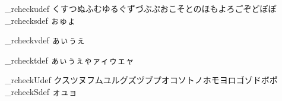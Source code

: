 \def\brl@mecab_rcheck_UU#1{%
  \ifcsname brl@mecab_rcheckV@\string#1\endcsname%
    \expandafter\aftergroup\brl@tmpfirst%
    \aftergroup\brl@mecab_rcheck@c%
    \aftergroup\brl@mecab_rcheck@U%
    \aftergroup#1%
    \let\brl@tmp\empty%
  \else%
    \aftergroup\brl@text_cmd_ambb%
    \expandafter\aftergroup\brl@tmpfirst%
    \aftergroup\brl@mecab_rcheck@U%
    \aftergroup\brl@text_cmd_ambe%
    \brl@mecab@doubtfultrue%
    \def\brl@tmp{#1}%
  \fi%
  \let\brl@mecab@prevchar\empty%
  \expandafter\brl@mecab_rcheck_\brl@tmp%
}




\def\brl@mecab_rcheckudef#1{%
  \def\brl@tmp{#1}%
  \ifx\brl@tmp\brl@@end%
  \else%
    \@namedef{brl@mecab_rcheck@#1}{\brl@mecab_rcheck_u#1}%
    \expandafter\brl@mecab_rcheckudef%
  \fi%
}
\def\brl@mecab_rchecksdef#1{%
  \def\brl@tmp{#1}%
  \ifx\brl@tmp\brl@@end%
  \else%
    \@namedef{brl@mecab_rcheck@#1}{\brl@mecab_rcheck_s#1}%
    \expandafter\brl@mecab_rchecksdef%
  \fi%
}

\def\brl@mecab_rchecktdef#1{%
  \def\brl@tmp{#1}%
  \ifx\brl@tmp\brl@@end%
  \else%
    \@namedef{brl@mecab_rcheck@#1}{\brl@mecab_rcheck_t#1}%
    \expandafter\brl@mecab_rchecktdef%
  \fi%
}

\def\brl@mecab_rcheckvdef#1{%
  \def\brl@tmp{#1}%
  \ifx\brl@tmp\brl@@end%
  \else%
    \@namedef{brl@mecab_rcheckv@#1}{}%
    \expandafter\brl@mecab_rcheckvdef%
  \fi%
}

\def\brl@mecab_rcheckUdef#1{%
  \def\brl@tmp{#1}%
  \ifx\brl@tmp\brl@@end%
  \else%
    \@namedef{brl@mecab_rcheck@#1}{\brl@mecab_rcheck_U#1}%
    \expandafter\brl@mecab_rcheckUdef%
  \fi%
}

\def\brl@mecab_rcheckSdef#1{%
  \def\brl@tmp{#1}%
  \ifx\brl@tmp\brl@@end%
  \else%
    \@namedef{brl@mecab_rcheck@#1}{\brl@mecab_rcheck_S#1}%
    \expandafter\brl@mecab_rcheckSdef%
  \fi%
}

\def\brl@mecab_rcheckVdef#1{%
  \def\brl@tmp{#1}%
  \ifx\brl@tmp\brl@@end%
  \else%
    \@namedef{brl@mecab_rcheckV@#1}{}%
    \expandafter\brl@mecab_rcheckVdef%
  \fi%
}


\brl@mecab_rcheckudef くすつぬふむゆるぐずづぶぷおこそとのほもよろごぞどぼぽ\brl@end
\brl@mecab_rchecksdef ぉゅょ\brl@end%

\brl@mecab_rcheckvdef ぁぃぅぇ\brl@end%

\brl@mecab_rchecktdef ぁぃぅぇゃァィゥェャ\brl@end

\brl@mecab_rcheckUdef クスツヌフムユルグズヅブプオコソトノホモヨロゴゾドボポ\brl@end
\brl@mecab_rcheckSdef ォュョ\brl@end

